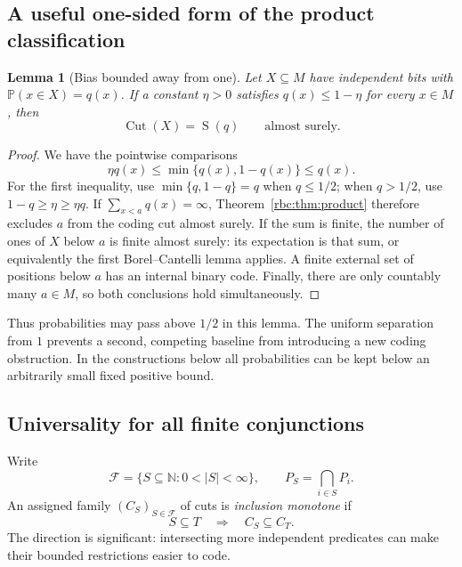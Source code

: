 \documentclass[11pt]{article}
\numberwithin{equation}{section}
\newtheorem{lemma}[theorem]{Lemma}
\theoremstyle{definition}
\theoremstyle{remark}
\newcommand{\N}{\mathbb N}
\newcommand{\Cut}{\operatorname{Cut}}
\newcommand{\SumCut}{\operatorname{S}}
\newcommand{\Prob}{\mathbb P}
\begin{document}
\subsection{A useful one-sided form of the product classification}

\begin{lemma}[Bias bounded away from one]
\label{rbc:bs:onesided}
Let $X\subseteq M$ have independent bits with
$\Prob(x\in X)=q(x)$.  If a constant $\eta>0$ satisfies
$q(x)\leq 1-\eta$ for every $x\in M$, then
\[
  \Cut(X)=\SumCut(q)\qquad\text{almost surely}.
\]
\end{lemma}

\begin{proof}
We have the pointwise comparisons
\[
  \eta q(x)\leq\min\{q(x),1-q(x)\}\leq q(x).
\]
For the first inequality, use $\min\{q,1-q\}=q$ when $q\leq1/2$;
when $q>1/2$, use $1-q\geq\eta\geq\eta q$.
If $\sum_{x<a}q(x)=\infty$, Theorem~\ref{rbc:thm:product} therefore excludes
$a$ from the coding cut almost surely.  If the sum is finite, the number of
ones of $X$ below $a$ is finite almost surely: its expectation is that sum,
or equivalently the first Borel--Cantelli lemma applies.  A finite external
set of positions below $a$ has an internal binary code.  Finally, there are
only countably many $a\in M$, so both conclusions hold simultaneously.
\end{proof}

Thus probabilities may pass above $1/2$ in this lemma.  The uniform separation
from $1$ prevents a second, competing baseline from introducing a new coding
obstruction.  In the constructions below all probabilities can be kept below
an arbitrarily small fixed positive bound.

\subsection{Universality for all finite conjunctions}

Write
\[
  \mathcal F=\{S\subseteq\N:0<|S|<\infty\},
  \qquad
  P_S=\bigcap_{i\in S}P_i.
\]
An assigned family $(C_S)_{S\in\mathcal F}$ of cuts is
\emph{inclusion monotone} if
\begin{equation}
\label{rbc:bs:monotonicity}
  S\subseteq T\quad\Longrightarrow\quad C_S\subseteq C_T.
\end{equation}
The direction is significant: intersecting more independent predicates can
make their bounded restrictions easier to code.
\end{document}
